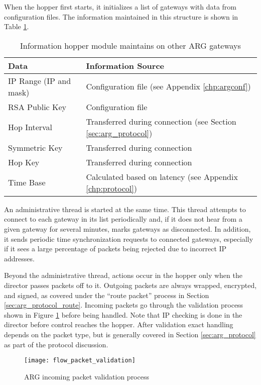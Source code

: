\par When the hopper first starts, it initializes a list of gateways with data from configuration files. The information maintained in this structure is shown in Table \ref{tab:gatestate}. 

\begin{table}
\caption{Information hopper module maintains on other \ac{ARG} gateways}
\label{tab:gatestate}
\centering
\begin{tabular}{l|l}
	\textbf{Data} & \textbf{Information Source}\\
	\hline
	IP Range (IP and mask) & Configuration file (see Appendix \ref{chp:argconf})\\
	\ac{RSA} Public Key & Configuration file\\
	Hop Interval & Transferred during connection (see Section \ref{sec:arg_protocol})\\
	Symmetric Key & Transferred during connection\\
	Hop Key & Transferred during connection\\
	Time Base & Calculated based on latency (see Appendix \ref{chp:protocol})\\
\end{tabular}
\end{table}

\par An administrative thread is started at the same time. This thread attempts to connect to each gateway in its list periodically and, if it does not hear from a given gateway for several minutes, marks gateways as disconnected. In addition, it sends periodic time synchronization requests to connected gateways, especially if it sees a large percentage of packets being rejected due to incorrect \ac{IP} addresses. 

\par Beyond the administrative thread, actions occur in the hopper only when the director passes packets off to it. Outgoing packets are always wrapped, encrypted, and signed, as covered under the ``route packet'' process in Section \ref{sec:arg_protocol_route}. Incoming packets go through the validation process shown in Figure \ref{fig:arg_hopper_in_validation} before being handled. Note that \ac{IP} checking is done in the director before control reaches the hopper. After validation exact handling depends on the packet type, but is generally covered in Section \ref{sec:arg_protocol} as part of the protocol discussion.

\begin{figure}
\caption{\ac{ARG} incoming packet validation process}
\label{fig:arg_hopper_in_validation}
\centering
\texttt{[image: flow\_packet\_validation]}
\end{figure}

